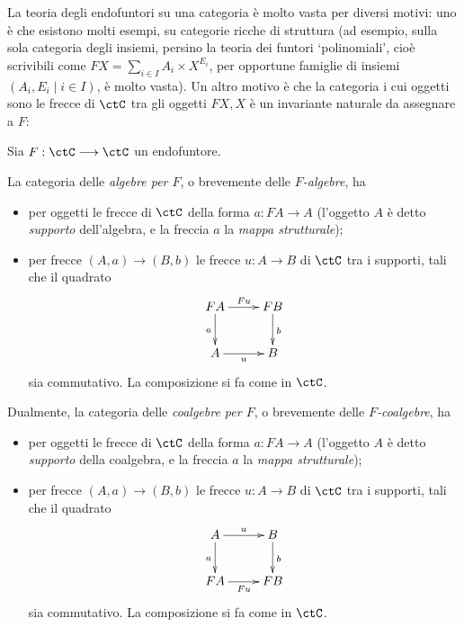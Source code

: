 La teoria degli endofuntori su una categoria è molto vasta per diversi motivi: uno è che esistono molti esempi, su categorie ricche di struttura (ad esempio, sulla sola categoria degli insiemi, persino la teoria dei funtori `polinomiali', cioè scrivibili come \(FX = \sum_{i\in I} A_i\times X^{E_i}\), per opportune famiglie di insiemi \((A_i,E_i\mid i\in I)\), è molto vasta). Un altro motivo è che la categoria i cui oggetti sono le frecce di \(\ctC\) tra gli oggetti \(FX , X\) è un invariante naturale da assegnare a \(F\):
\begin{definition}
	Sia \(F : \ctC\fun\ctC\) un endofuntore.

	La categoria delle \emph{algebre per \(F\)}, o brevemente delle \emph{\(F\)-algebre}, ha
	\begin{itemize}
		\item per oggetti le frecce di \(\ctC\) della forma \(a : FA\to A\) (l'oggetto \(A\) è detto \emph{supporto} dell'algebra, e la freccia \(a\) la \emph{mappa strutturale});
		\item per frecce \((A,a)\to (B,b)\) le frecce \(u : A\to B\) di \(\ctC\) tra i supporti, tali che il quadrato
		      \[\xymatrix{
				      FA \ar[r]^{Fu}\ar[d]_a & FB \ar[d]^b\\
				      A \ar[r]_-u & B
			      }\]
		      sia commutativo. La composizione si fa come in \(\ctC\).
	\end{itemize}
	Dualmente, la categoria delle \emph{coalgebre per \(F\)}, o brevemente delle \emph{\(F\)-coalgebre}, ha
	\begin{itemize}
		\item per oggetti le frecce di \(\ctC\) della forma \(a : FA\to A\) (l'oggetto \(A\) è detto \emph{supporto} della coalgebra, e la freccia \(a\) la \emph{mappa strutturale});
		\item per frecce \((A,a)\to (B,b)\) le frecce \(u : A\to B\) di \(\ctC\) tra i supporti, tali che il quadrato
		      \[\xymatrix{
				      A \ar[d]_a\ar[r]^-u & B\ar[d]^b\\
				      FA \ar[r]_{Fu} & FB
			      }\]
		      sia commutativo. La composizione si fa come in \(\ctC\).
	\end{itemize}
\end{definition}
